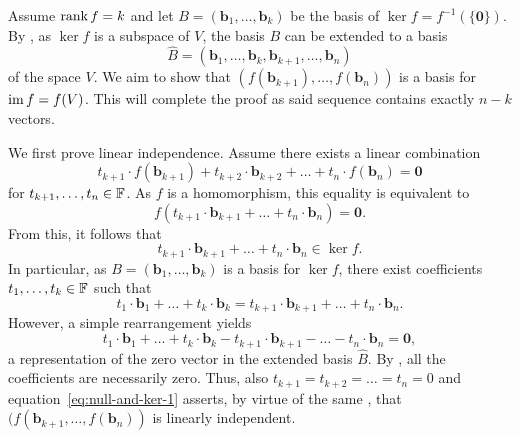 \begin{propproof}
 Assume $\operatorname{rank} f = k$ and let $B = (\mathbf{b}_1,\ldots,\mathbf{b}_k)$ be the
 basis of $\ker f = f^{-1}(\{\mathbf{0}\})$. By
 , as $\ker f$ is a subspace of $V$, the
 basis $B$ can be extended to a basis
 \[
  \hat{B} =
  (\mathbf{b}_1,\ldots,\mathbf{b}_k,\mathbf{b}_{k+1},\ldots,\mathbf{b}_n)
 \]
 of the space $V$. We aim to show that
 $(f(\mathbf{b}_{k+1}),\ldots,f(\mathbf{b}_n))$ is a basis for $\operatorname{im} f = f(V)$.
 This will complete the proof as said sequence contains exactly $n - k$ vectors.

 We first prove linear independence. Assume there exists a linear combination
 \begin{equation}
  \label{eq:null-and-ker-1}
  t_{k+1} \cdot f(\mathbf{b}_{k+1}) + t_{k+2} \cdot \mathbf{b}_{k+2} + \ldots +
  t_n \cdot f(\mathbf{b}_n) = \mathbf{0}
 \end{equation}
 for $t_{k+1},\ldots,t_n \in \mathbb{F}$. As $f$ is a homomorphism, this equality is
 equivalent to
 \[
  f(t_{k+1} \cdot \mathbf{b}_{k+1} + \ldots + t_n \cdot \mathbf{b}_n) =
  \mathbf{0}.
 \]
 From this, it follows that
 \[
  t_{k+1} \cdot \mathbf{b}_{k+1} + \ldots + t_n \cdot \mathbf{b}_n \in \ker f.
 \]
 In particular, as $B = (\mathbf{b}_1,\ldots,\mathbf{b}_k)$ is a basis for $\ker
 f$, there exist coefficients $t_1,\ldots,t_k \in \mathbb{F}$ such that
 \[
  t_1 \cdot \mathbf{b}_1 + \ldots + t_k \cdot \mathbf{b}_k = t_{k+1} \cdot
  \mathbf{b}_{k+1} + \ldots + t_n \cdot \mathbf{b}_n.
 \]
 However, a simple rearrangement yields
 \[
  t_1 \cdot \mathbf{b}_1 + \ldots + t_k \cdot \mathbf{b}_k - t_{k+1} \cdot
  \mathbf{b}_{k+1} - \ldots - t_n \cdot \mathbf{b}_n = \mathbf{0},
 \]
 a representation of the zero vector in the extended basis $\hat{B}$. By
 , all the coefficients are
 necessarily zero. Thus, also $t_{k+1} = t_{k+2} = \ldots = t_n = 0$ and
 equation~\eqref{eq:null-and-ker-1} asserts, by virtue of the same
 , that
 $(f(\mathbf{b}_{k+1},\ldots,f(\mathbf{b}_n))$ is linearly independent.


\end{propproof}
